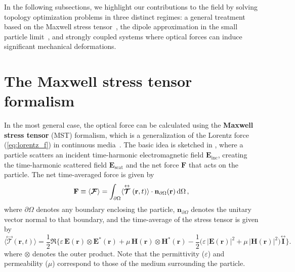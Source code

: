  In the following subsections, we highlight our contributions to the field by solving topology optimization problems in three distinct regimes: a general treatment based on the Maxwell stress tensor~\cite{ownpub2}, 
 the dipole approximation in the small particle limit~\cite{ownpub1, ownpub3}, and strongly coupled systems where optical forces can induce significant mechanical deformations.
\section{The Maxwell stress tensor formalism~\cite{ownpub2}}\label{sec:engi}

In the most general case, the optical force can be calculated using the \textbf{Maxwell stress tensor} (MST) formalism, which is a generalization of the Lorentz force (\eqref{eq:lorentz_f}) in continuous media~\cite{novotny}.
The basic idea is sketched in , where
a particle scatters an incident time-harmonic electromagnetic field $\mathbf{E}_\text{inc}$, creating the time-harmonic scattered field $\mathbf{E}_\text{scat}$ and the net force $\mathbf{F}$ that acts
on the particle. The net time-averaged force is given by~\cite{novotny}
\begin{equation}\label{eq:f_MST}
    \mathbf{F} \equiv \langle\bm{\mathcal{F}}\rangle=\int_{\partial \Omega}\langle\stackrel{\leftrightarrow}{\bm{\mathcal{T}}}(\mathbf{r}, t)\rangle \cdot \mathbf{n}_{\partial \Omega}(\mathbf{r}) \mathop{}\!\text{d} \Omega\,,
\end{equation}
where $\partial \Omega$ denotes any boundary enclosing the particle, $\mathbf{n}_{\partial \Omega}$ denotes the unitary vector normal to that boundary, and
the time-average of the stress tensor is given by
\begin{equation}
        \langle \stackrel{\leftrightarrow}{\bm{\mathcal{T}}}(\mathbf{r}, t) \rangle 
        = \frac{1}{2} \Re \Big\{ 
            \varepsilon\, \mathbf{E}(\mathbf{r}) \otimes \mathbf{E}^*(\mathbf{r})
            + \mu\, \mathbf{H}(\mathbf{r}) \otimes \mathbf{H}^*(\mathbf{r})
         - \frac{1}{2} \big( \varepsilon\, |\mathbf{E}(\mathbf{r})|^2 + \mu\, |\mathbf{H}(\mathbf{r})|^2 \big) 
        \stackrel{\leftrightarrow}{\mathbf{I}} \Big\}.
\end{equation}
where $\otimes$ denotes the outer product. Note that the permittivity ($\varepsilon$) and permeability ($\mu$) correspond to those of the medium surrounding the particle.

